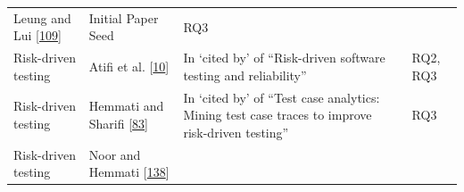 \documentclass[]{book}
\begin{document}
\begin{longtable}[]{@{}llll@{}}
\begin{minipage}[t]{0.16\columnwidth}
Leung and Lui {[}\protect\hyperlink{ref-leung2015testing}{109}{]}\strut
\end{minipage} & \begin{minipage}[t]{0.50\columnwidth}\raggedright\strut
Initial Paper Seed\strut
\end{minipage} & \begin{minipage}[t]{0.04\columnwidth}\raggedright\strut
RQ3\strut
\end{minipage}\tabularnewline
\begin{minipage}[t]{0.18\columnwidth}\raggedright\strut
Risk-driven testing\strut
\end{minipage} & \begin{minipage}[t]{0.16\columnwidth}\raggedright\strut
Atifi et al. {[}\protect\hyperlink{ref-atifi2017}{10}{]}\strut
\end{minipage} & \begin{minipage}[t]{0.50\columnwidth}\raggedright\strut
In `cited by' of ``Risk-driven software testing and reliability''\strut
\end{minipage} & \begin{minipage}[t]{0.04\columnwidth}\raggedright\strut
RQ2, RQ3\strut
\end{minipage}\tabularnewline
\begin{minipage}[t]{0.18\columnwidth}\raggedright\strut
Risk-driven testing\strut
\end{minipage} & \begin{minipage}[t]{0.16\columnwidth}\raggedright\strut
Hemmati and Sharifi {[}\protect\hyperlink{ref-hemmati2018}{83}{]}\strut
\end{minipage} & \begin{minipage}[t]{0.50\columnwidth}\raggedright\strut
In `cited by' of ``Test case analytics: Mining test case traces to
improve risk-driven testing''\strut
\end{minipage} & \begin{minipage}[t]{0.04\columnwidth}\raggedright\strut
RQ3\strut
\end{minipage}\tabularnewline
\begin{minipage}[t]{0.18\columnwidth}\raggedright\strut
Risk-driven testing\strut
\end{minipage} & \begin{minipage}[t]{0.16\columnwidth}\raggedright\strut
Noor and Hemmati {[}\protect\hyperlink{ref-noor2015test}{138}{]}\strut
\end{minipage} & \begin{minipage}[t]{0.50\columnwidth}\raggedright\strut

\end{minipage}
\end{longtable}
\end{document}
